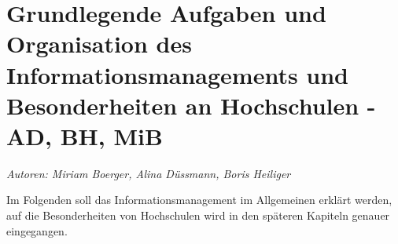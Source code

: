 \chapter{Grundlegende Aufgaben und Organisation des Informationsmanagements und Besonderheiten an Hochschulen - AD, BH, MiB}
\label{chapter_grundlagen_INM}

\textit{Autoren: Miriam Boerger, Alina Düssmann, Boris Heiliger}

Im Folgenden soll das Informationsmanagement im Allgemeinen erklärt werden, auf die Besonderheiten von Hochschulen wird in den späteren Kapiteln genauer eingegangen.






